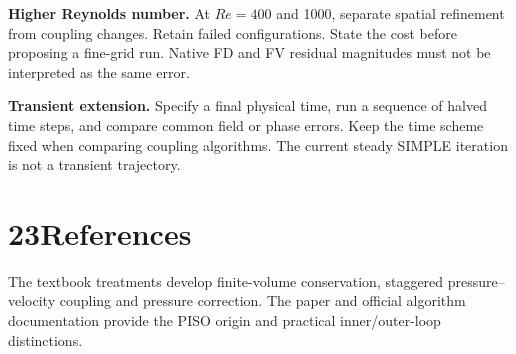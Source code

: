 \documentclass[11pt]{article}
\newcommand{\topic}[2]{\section*{#1\quad #2}}
\begin{document}
\textbf{Higher Reynolds number.} At $Re=400$ and 1000, separate spatial refinement from coupling changes. Retain failed configurations. State the cost before proposing a fine-grid run. Native FD and FV residual magnitudes must not be interpreted as the same error.

\textbf{Transient extension.} Specify a final physical time, run a sequence of halved time steps, and compare common field or phase errors. Keep the time scheme fixed when comparing coupling algorithms. The current steady SIMPLE iteration is not a transient trajectory.
\newpage

\newpage

\newpage

\newpage
\topic{23}{References}
The textbook treatments develop finite-volume conservation, staggered pressure--velocity coupling and pressure correction. The paper and official algorithm documentation provide the PISO origin and practical inner/outer-loop distinctions.
\end{document}
